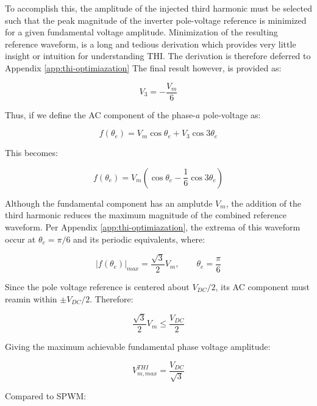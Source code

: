 \documentclass{article}
\begin{document}
To accomplish this, the amplitude of the injected third harmonic must be selected such that the peak magnitude of the inverter pole-voltage reference is minimized for a given fundamental voltage amplitude. Minimization of the resulting reference waveform, is a long and tedious derivation which provides very little insight or intuition for understanding THI. The derivation is therefore deferred to Appendix \ref{app:thi-optimiazation} The final result however, is provided as:

\begin{equation}
    V_3 = -\frac{V_m}{6}
\end{equation}

Thus, if we define the AC component of the phase-$a$ pole-voltage as:

\begin{equation}
    f(\theta_e) = V_m\cos\theta_e + V_3\cos3\theta_e
\end{equation}

This becomes:

\begin{equation}
    f(\theta_e) = V_m(\cos\theta_e - \frac{1}{6}\cos3\theta_e)
\end{equation}

Although the fundamental component has an amplutde $V_m$, the addition of the third harmonic reduces the maximum magnitude of the combined reference waveform. Per Appendix \ref{app:thi-optimiazation}, the extrema of this waveform occur at $\theta_e = \pi/6$ and its periodic equivalents, where:

\begin{equation}
    |f(\theta_e)|_{max} = \frac{\sqrt{3}}{2}V_m, \qquad
    \theta_e = \frac{\pi}{6}
\end{equation}

Since the pole voltage reference is centered about $V_{DC}/2$, its AC component must reamin within $\pm V_{DC}/2$. Therefore:

\begin{equation}
    \frac{\sqrt{3}}{2}V_m \leq \frac{V_{DC}}{2}
\end{equation}

Giving the maximum achievable fundamental phase voltage amplitude:

\begin{equation}
    \boxed{
        V_{m,max}^{THI} = \frac{V_{DC}}{\sqrt{3}}
        }
\end{equation}

Compared to SPWM:
\end{document}
